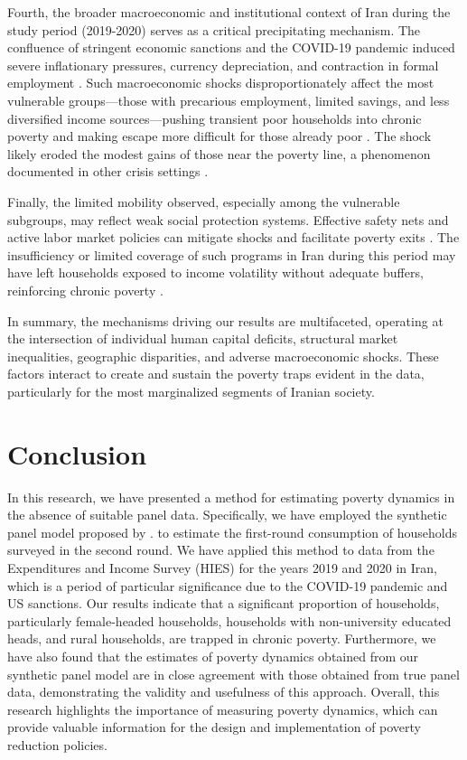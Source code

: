 \documentclass[12pt,a4paper]{article}
\begin{document}
Fourth, the broader macroeconomic and institutional context of Iran during the study period (2019-2020) serves as a critical precipitating mechanism. The confluence of stringent economic sanctions and the COVID-19 pandemic induced severe inflationary pressures, currency depreciation, and contraction in formal employment \citep{amid2021sanctions}. Such macroeconomic shocks disproportionately affect the most vulnerable groups—those with precarious employment, limited savings, and less diversified income sources—pushing transient poor households into chronic poverty and making escape more difficult for those already poor \citep{dercon2005vulnerability}. The shock likely eroded the modest gains of those near the poverty line, a phenomenon documented in other crisis settings \citep{hallegatte2016shock}.

Finally, the limited mobility observed, especially among the vulnerable subgroups, may reflect weak social protection systems. Effective safety nets and active labor market policies can mitigate shocks and facilitate poverty exits \citep{barrientos2011social}. The insufficiency or limited coverage of such programs in Iran during this period may have left households exposed to income volatility without adequate buffers, reinforcing chronic poverty \citep{moradi2021welfare}.

In summary, the mechanisms driving our results are multifaceted, operating at the intersection of individual human capital deficits, structural market inequalities, geographic disparities, and adverse macroeconomic shocks. These factors interact to create and sustain the poverty traps evident in the data, particularly for the most marginalized segments of Iranian society.

\section{Conclusion}
In this research, we have presented a method for estimating poverty dynamics in the absence of suitable panel data. Specifically, we have employed the synthetic panel model proposed by \cite{dang2014using}. to estimate the first-round consumption of households surveyed in the second round. We have applied this method to data from the Expenditures and Income Survey (HIES) for the years 2019 and 2020 in Iran, which is a period of particular significance due to the COVID-19 pandemic and US sanctions. Our results indicate that a significant proportion of households, particularly female-headed households, households with non-university educated heads, and rural households, are trapped in chronic poverty. Furthermore, we have also found that the estimates of poverty dynamics obtained from our synthetic panel model are in close agreement with those obtained from true panel data, demonstrating the validity and usefulness of this approach. Overall, this research highlights the importance of measuring poverty dynamics, which can provide valuable information for the design and implementation of poverty reduction policies.
\end{document}
